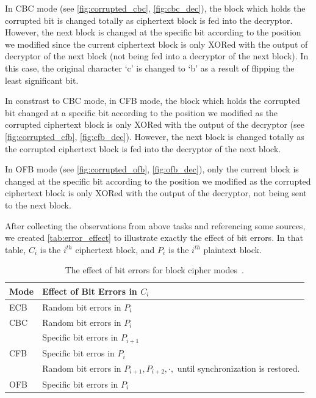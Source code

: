 In CBC mode (see \autoref{fig:corrupted_cbc}, \autoref{fig:cbc_dec}), the block which holds
the corrupted bit
is changed totally as ciphertext block is fed into the decryptor. However, the next block
is changed at the specific bit according to the position we modified since the current ciphertext
block is only XORed with the output of decryptor of the next block (not being fed into
a decryptor of the next block). In this case, the original character `c' is changed to
`b' as a result of flipping the least significant bit.

In constrast to CBC mode, in CFB mode, the block which holds the corrupted bit changed at a specific
bit according to the position we modified as the corrupted ciphertext block is only XORed
with the output of the decryptor (see \autoref{fig:corrupted_cfb}, \autoref{fig:cfb_dec}).
However, the next block is changed totally as the corrupted ciphertext block is fed into
the decryptor of the next block.

In OFB mode (see \autoref{fig:corrupted_ofb}, \autoref{fig:ofb_dec}), only the current block
is changed at the specific bit according to the position we modified as the corrupted ciphertext
block is only XORed with the output of the decryptor, not being sent to the next block.

After collecting the observations from above tasks and referencing some sources, we created
\autoref{tab:error_effect} to illustrate exactly the effect of bit errors. In that table,
\(C_i\) is the \(i^{th}\) ciphertext block, and \(P_i\) is the \(i^{th}\) plaintext block.

\begin{table}
    \centering
    \begin{tabular}{|l|l|}
        \hline
        Mode & Effect of Bit Errors in \(C_i\)\\
        \hline
        ECB & Random bit errors in \(P_i\)\\
        \hline
        CBC & Random bit errors in \(P_i\)\\
         & Specific bit errors in \(P_{i+1}\)\\
        \hline
        CFB & Specific bit erros in \(P_i\)\\
         & Random bit errors in \(P_{i+1},P_{i+2},\cdot,\) until synchronization is restored.\\
        \hline
        OFB & Specific bit errors in \(P_i\)\\
        \hline
    \end{tabular}
    \caption{The effect of bit errors for block cipher modes~\cite{cipher_mode_wiki,error_prop}.}
    \label{tab:error_effect}
\end{table}
